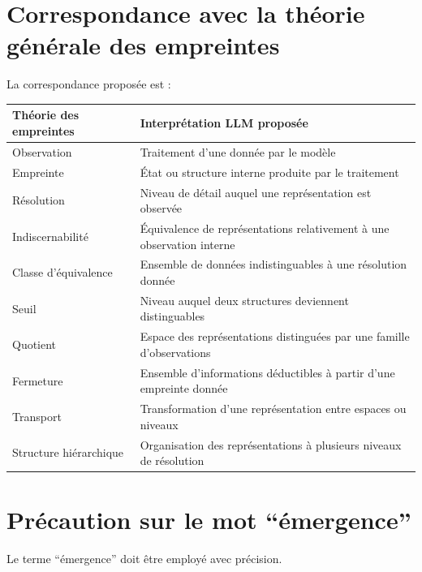 \documentclass[11pt,a4paper]{article}
\begin{document}
\section{Correspondance avec la théorie générale des empreintes}

La correspondance proposée est :

\begin{center}
\begin{tabular}{>{\raggedright}p{}
                >{\raggedright\arraybackslash}p{}}
\toprule
\textbf{Théorie des empreintes}
&
\textbf{Interprétation LLM proposée}
\\
\midrule
Observation
&
Traitement d'une donnée par le modèle
\\
Empreinte
&
État ou structure interne produite par le traitement
\\
Résolution
&
Niveau de détail auquel une représentation est observée
\\
Indiscernabilité
&
Équivalence de représentations relativement à une observation interne
\\
Classe d'équivalence
&
Ensemble de données indistinguables à une résolution donnée
\\
Seuil
&
Niveau auquel deux structures deviennent distinguables
\\
Quotient
&
Espace des représentations distinguées par une famille d'observations
\\
Fermeture
&
Ensemble d'informations déductibles à partir d'une empreinte donnée
\\
Transport
&
Transformation d'une représentation entre espaces ou niveaux
\\
Structure hiérarchique
&
Organisation des représentations à plusieurs niveaux de résolution
\\
\bottomrule
\end{tabular}
\end{center}

\section{Précaution sur le mot ``émergence''}

Le terme ``émergence'' doit être employé avec précision.
\end{document}
